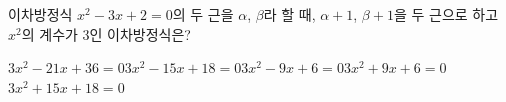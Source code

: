 이차방정식 $x^2-3x+2=0$의 두 근을 $\alpha$, $\beta$라 할 때, $\alpha+1$, $\beta+1$을 두 근으로 하고 $x^2$의 계수가 $3$인 이차방정식은?
\begin{choicesii}{$3x^2-21x+36=0$}{$3x^2-15x+18=0$}{$3x^2-9x+6=0$}{$3x^2+9x+6=0$}{$3x^2+15x+18=0$}\end{choicesii}
